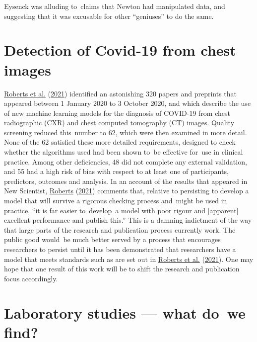 \documentclass[
  10pt,
  b5paper]{book}
\begin{document}
Eysenck was alluding to~claims that Newton had manipulated data, and
suggesting that it was excusable for other ``geniuses'' to do the same.

\hypertarget{detection-of-covid-19-from-chest-images}{%
\section{Detection of Covid-19 from chest images}\label{detection-of-covid-19-from-chest-images}}

\protect\hyperlink{ref-roberts2021common}{Roberts et al.} (\protect\hyperlink{ref-roberts2021common}{2021}) identified an astonishing 320 papers and preprints
that appeared between 1 January 2020 to 3 October 2020, and which
describe the use of new machine learning models for the diagnosis of
COVID-19 from chest radiographic (CXR) and chest computed tomography
(CT) images. Quality screening reduced this~number to 62, which were
then examined in more detail. None of the 62 satisfied these more
detailed requirements, designed to check whether the algorithms used
had been shown to~be effective for~use in clinical practice. Among
other deficiencies, 48 did not complete any external validation, and
55 had a high risk of bias with respect to at least one of
participants, predictors, outcomes and analysis. In an account
of the results that appeared in New Scientist, \protect\hyperlink{ref-roberts2021machine}{Roberts} (\protect\hyperlink{ref-roberts2021machine}{2021})
comments that, relative
to persisting to develop a model that will survive a rigorous
checking process and~might be used in practice, ``it is far easier
to~develop~a model with poor rigour and {[}apparent{]} excellent
performance and publish this.'' This is a damning indictment of
the way that large parts of the research and publication process
currently work. The public good would~be much better served
by a process that encourages researchers to persist until it
has been demonstrated that researchers have a model that meets
standards such as are set out in \protect\hyperlink{ref-roberts2021common}{Roberts et al.} (\protect\hyperlink{ref-roberts2021common}{2021}). One may
hope that one result of this work will be to shift the research
and publication focus accordingly.

\hypertarget{sec:lab}{%
\section{Laboratory studies --- what do~we find?}\label{sec:lab}}
\end{document}
